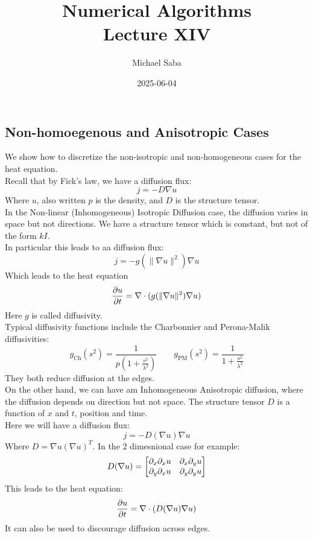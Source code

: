 \documentclass[12pt]{article}
\title{%
    \Huge Numerical Algorithms \\
    \Large Lecture XIV
}
\date{2025-06-04}
\author{Michael Saba}
\begin{document}
\maketitle
\newpage
\setlength{\parindent}{0pt}

\subsection*{Non-homoegenous and Anisotropic Cases}

We show how to discretize the
non-isotropic and non-homogeneous cases
for the heat equation. \\

Recall that by Fick's law, we have a diffusion flux:
\[ j = -D\nabla u \]
Where $u$, also written $p$ is the density, and $D$ is the
structure tensor. \\

In the Non-linear (Inhomogeneous) Isotropic Diffusion
case, the diffusion varies in space but not
directions. We have a structure tensor which
is constant, but not of the form $kI$. \\
In particular this leads to aa diffusion flux:
\[ j = -g(\|\nabla u\|^2)\nabla u \]
Which leads to the heat equation
\[ \dfrac{\partial u}{\partial t} = \nabla \cdot (g(\|\nabla u\|^2) 
\nabla u) \]
Here $g$ is called diffusivity. \\

Typical diffusivity functions include the Charbonnier 
and Perona-Malik diffusivities:
\[ g_{\text{Ch}}(s^2) = 
\frac{1}{p \left( 1 + \frac{s^2}{\lambda^2} \right)} 
\qquad g_{\text{PM}}(s^2) = 
\frac{1}{1 + \frac{s^2}{\lambda^2}} \]
They both reduce diffusion at the edges. \\

On the other hand, we can have am Inhomogeneous Anisotropic
diffusion, where the diffusion depends on direction
but not space. 
The structure tensor $D$ is a function of $x$ and $t$,
position and time. \\
Here we will have a diffusion flux:
\[ j = -D(\nabla u)\nabla u \]
Where $D = \nabla u (\nabla u)^T$. 
In the $2$ dimesnional case for example:
\[ D(\nabla u) = \begin{bmatrix} \partial_{x}\partial_{x} u 
& \partial_{x}\partial_{y}u \\
\partial_{y}\partial_{x}u &
\partial_{y}\partial_{y}u \end{bmatrix} \]
This leads to the heat equation:
\[ \dfrac{\partial u}{\partial t} = \nabla \cdot (D(\nabla u) \nabla u) \]
It can also be used to
discourage diffusion across edges. \\
\end{document}
